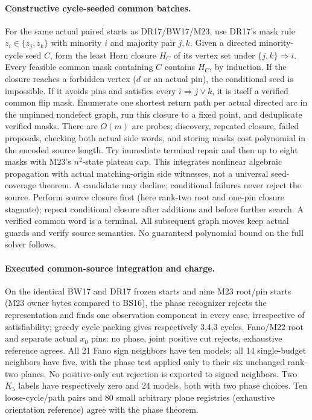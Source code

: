 \documentclass[11pt]{article}
\begin{document}
\paragraph{Constructive cycle-seeded common batches.}
For the same actual paired starts as DR17/BW17/M23, use DR17's mask rule $z_i\in\{z_j,z_k\}$ with minority $i$ and majority pair $j,k$. Given a directed minority-cycle seed $C$, form the least Horn closure $H_C$ of its vertex set under $\{j,k\}\Rightarrow i$. Every feasible common mask containing $C$ contains $H_C$, by induction. If the closure reaches a forbidden vertex ($d$ or an actual pin), the conditional seed is impossible. If it avoids pins and satisfies every $i\Rightarrow j\lor k$, it is itself a verified common flip mask. Enumerate one shortest return path per actual directed arc in the unpinned nondefect graph, run this closure to a fixed point, and deduplicate verified masks. There are $O(m)$ arc probes; discovery, repeated closure, failed proposals, checking both actual side words, and storing masks cost polynomial in the encoded source length. Try immediate terminal repair and then up to eight masks with M23's $n^2$-state plateau cap. This integrates nonlinear algebraic propagation with actual matching-origin side witnesses, not a universal seed-coverage theorem. A candidate may decline; conditional failures never reject the source. Perform source closure first (here rank-two root and one-pin closure stagnate); repeat conditional closure after additions and before further search. A verified common word is a terminal. All subsequent graph moves keep actual guards and verify source semantics. No guaranteed polynomial bound on the full solver follows.

\paragraph{Executed common-source integration and charge.}
On the identical BW17 and DR17 frozen starts and nine M23 root/pin starts (M23 owner bytes compared to BS16), the phase recognizer rejects the representation and finds one observation component in every case, irrespective of satisfiability; greedy cycle packing gives respectively 3,4,3 cycles. Fano/M22 root and separate actual $x_0$ pins: no phase, joint positive cut rejects, exhaustive reference agrees. All 21 Fano sign neighbors have ten models; all 14 single-budget neighbors have five, with the phase test applied only to their six unchanged rank-two planes. No positive-only cut rejection is exported to signed neighbors. Two $K_5$ labels have respectively zero and 24 models, both with two phase choices. Ten loose-cycle/path pairs and 80 small arbitrary plane registries (exhaustive orientation reference) agree with the phase theorem.
\end{document}
